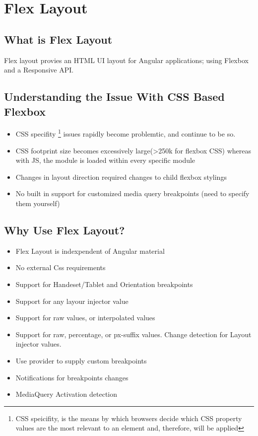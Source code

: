 \maketitle{}
\section{ Flex Layout }

\subsection{ What is Flex Layout }
Flex layout provies an HTML UI layout for Angular applications; using Flexbox
and a Responsive API.

\subsection{ Understanding the Issue With CSS Based Flexbox }
\begin{itemize}
  \item CSS specifity \footnote{CSS speicifity, is the means by which browsers
  decide which CSS property values are the most relevant to an element and,
  therefore, will be applied} issues rapidly become problemtic, and continue
  to be so.
  \item CSS footprint size becomes excessively large(>250k for flexbox CSS)
  whereas with JS, the module is loaded within every specific module
  \item Changes in layout direction required changes to child flexbox stylings
  \item No built in support for customized media query breakpoints (need to 
  specify them yourself)
\end{itemize}

\subsection{ Why Use Flex Layout? }
\begin{itemize}
  \item Flex Layout is indexpendent of Angular material
  \item No external Css requirements
  \item Support for Handeset/Tablet and Orientation breakpoints
  \item Support for any layour injector value
  \item Support for raw values, or interpolated values
  \item Support for raw, percentage, or px-suffix values. Change detection
  for Layout injector values.
  \item Use provider to supply custom breakpoints
  \item Notifications for breakpoints changes
  \item MediaQuery Activation detection
\end{itemize}

